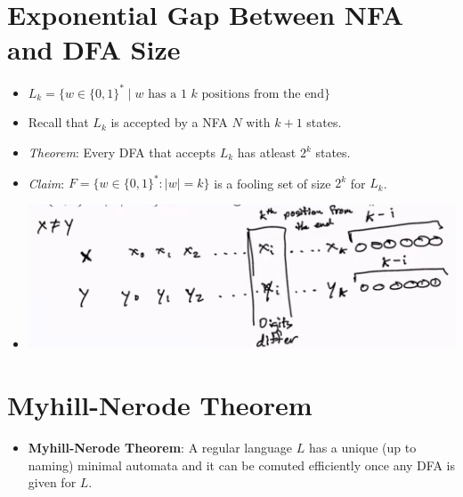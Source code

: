 \section{Exponential Gap Between NFA and DFA Size}
\begin{itemize}
    \item $L_k = \{ w \in \{ 0, 1 \}^{\ast} \mid \text{$w$ has a 1 $k$ positions from the end} \}$
    \item Recall that $L_k$ is accepted by a NFA $N$ with $k+1$ states.
    \item \textit{Theorem}: Every DFA that accepts $L_k$ has atleast $2^k$ states.
    \item \textit{Claim}: $F = \{ w \in \{ 0, 1 \}^{\ast}: \left|w\right| = k \}$ is a fooling set of size $2^k$ for $L_k$.
    \item[] \includegraphics[width=\textwidth]{lecture7/images/fooling-set-2^k.png}
\end{itemize}

\section{Myhill-Nerode Theorem}
\begin{itemize}
    \item \textbf{Myhill-Nerode Theorem}: A regular language $L$ has a unique (up to naming) minimal automata and it can be comuted efficiently once any DFA is given for $L$.
\end{itemize}
